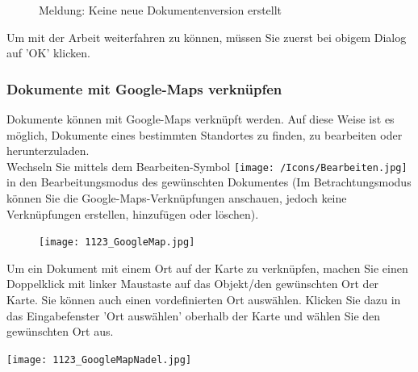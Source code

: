 \begin{figure}[H]
\caption{Meldung: Keine neue Dokumentenversion erstellt}
\end{figure}

Um mit der Arbeit weiterfahren zu können, müssen Sie zuerst bei obigem Dialog auf 'OK' klicken.

\subsubsection{Dokumente mit Google-Maps verknüpfen}
\label{bkm:Ref442545553}
Dokumente können mit Google-Maps verknüpft werden. Auf diese Weise ist es möglich, Dokumente eines bestimmten Standortes zu finden, zu bearbeiten oder herunterzuladen. \\
Wechseln Sie mittels dem Bearbeiten-Symbol \texttt{[image: /Icons/Bearbeiten.jpg]} in den Bearbeitungsmodus des gewünschten Dokumentes (Im Betrachtungsmodus können Sie die Google-Maps-Verknüpfungen anschauen, jedoch keine Verknüpfungen erstellen, hinzufügen oder löschen).

\vspace{2mm}

\begin{figure}
\vspace{-15pt}
\texttt{[image: 1123\_GoogleMap.jpg]}
\end{figure}

Um ein Dokument mit einem Ort auf der Karte zu verknüpfen, machen Sie einen Doppelklick mit linker Maustaste auf das Objekt/den gewünschten Ort der Karte. Sie können auch einen vordefinierten Ort auswählen. Klicken Sie dazu in das Eingabefenster 'Ort auswählen' oberhalb der Karte und wählen Sie den gewünschten Ort aus.

\vspace{4mm}

\hspace{15mm} \texttt{[image: 1123\_GoogleMapNadel.jpg]}

